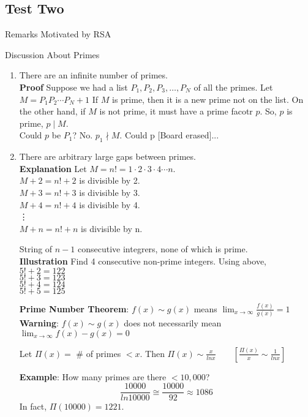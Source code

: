 \subsection*{Test Two}

\pagebreak

Remarks Motivated by RSA

Discussion About Primes
\begin{enumerate}
\item There are an infinite number of primes. \\
\textbf{Proof} Suppose we had a list $P_1,P_2,P_3,\ldots,P_N$ of all the primes. Let \\$M = P_1 P_2 \cdots P_N + 1$ If $M$ is prime, then it is a new prime not on the list. On the other hand, if $M$ is not prime, it must have a prime facotr $p$. So, $p$ is prime, $p \mid M$.\\
Could $p$ be $P_1$? No. $p_1 \nmid M$. Could p [Board erased]...

\item There are arbitrary large gaps between primes.\\
\textbf{Explanation} Let $M = n! = 1 \cdot 2 \cdot 3 \cdot 4 \cdots n$.\\
$M+2 = n! + 2$ is divisible by 2. \\
$M+3 = n! + 3$ is divisible by 3. \\
$M+4 = n! + 4$ is divisible by 4. \\
\vdots \\
$M+n = n! + n$ is divisible by n.

String of $n-1$ consecutive integrers, none of which is prime.\\
\textbf{Illustration} Find 4 consecutive non-prime integers.
Using above, \\
$5! + 2 = 122$ \\
$5! + 3 = 123$ \\
$5! + 4 = 124$ \\
$5! + 5 = 125$

\textbf{Prime Number Theorem}: $f(x) \sim g(x)$ means $\lim_{x \rightarrow \infty}\frac{f(x)}{g(x)} = 1$\\
\textbf{Warning}: $f(x) \sim g(x)$ does not necessarily mean $\lim_{x \rightarrow \infty} f(x) - g(x) = 0$

Let $\Pi(x) = $ \# of primes $< x$. Then $\Pi(x) \sim \frac{x}{ln{x}}\qquad  \left[ \frac{\Pi(x)}{x} \sim \frac{1}{ln{x}} \right]$

\textbf{Example}: How many primes are there $< 10,000$?
\[
\frac{10000}{ln{10000}} \cong \frac{10000}{92} \approx 1086
\]
In fact, $\Pi(10000) = 1221$.

\end{enumerate}

